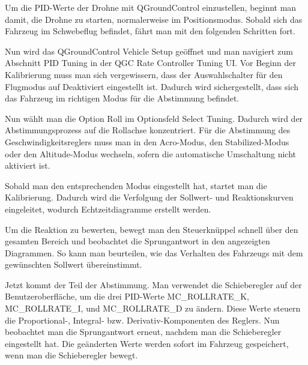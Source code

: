 Um die PID-Werte der Drohne mit QGroundControl einzustellen, beginnt man damit, die Drohne zu starten, normalerweise im Positionsmodus. Sobald sich das Fahrzeug im Schwebeflug befindet, fährt man mit den folgenden Schritten fort.

Nun wird  das QGroundControl Vehicle Setup geöffnet und man navigiert zum Abschnitt PID Tuning in der QGC Rate Controller Tuning UI. Vor Beginn der Kalibrierung muss man sich vergewissern, dass der Auswahlschalter für den Flugmodus auf Deaktiviert eingestellt ist. Dadurch wird sichergestellt, dass sich das Fahrzeug im richtigen Modus für die Abstimmung befindet.

Nun wählt man die Option Roll im Optionsfeld Select Tuning. Dadurch wird der Abstimmungsprozess auf die Rollachse konzentriert.
Für die Abstimmung des Geschwindigkeitsreglers muss man in den Acro-Modus, den Stabilized-Modus oder den Altitude-Modus wechseln, sofern die automatische Umschaltung nicht aktiviert ist.

Sobald man den entsprechenden Modus eingestellt hat, startet man die Kalibrierung. Dadurch wird die Verfolgung der Sollwert- und Reaktionskurven eingeleitet, wodurch Echtzeitdiagramme erstellt werden.

Um die Reaktion zu bewerten, bewegt man den Steuerknüppel schnell über den gesamten Bereich und beobachtet die Sprungantwort in den angezeigten Diagrammen. So kann man beurteilen, wie das Verhalten des Fahrzeugs mit dem gewünschten Sollwert übereinstimmt.

Jetzt kommt der Teil der Abstimmung. Man verwendet die Schieberegler auf der Benutzeroberfläche, um die drei PID-Werte MC\_ROLLRATE\_K, MC\_ROLLRATE\_I, und MC\_ROLLRATE\_D zu ändern. Diese Werte steuern die Proportional-, Integral- bzw. Derivativ-Komponenten des Reglers. Nun beobachtet man die Sprungantwort erneut, nachdem man die Schieberegler eingestellt hat. Die geänderten Werte werden sofort im Fahrzeug gespeichert, wenn man die Schieberegler bewegt.

